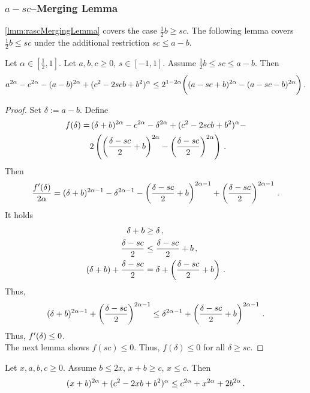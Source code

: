 \subsubsection{$a-sc$--Merging Lemma}
%
\autoref{lmm:rascMergingLemma} covers the case $\frac12 b \geq sc$.
The following lemma covers  $\frac12 b \leq sc$  under the additional restriction $sc \leq a-b$.
%
\begin{lemma}\label{lmm:merging:asc}
	Let $\alpha\in[\frac12,1]$.
	Let $a,b,c\geq0$, $s\in[-1,1]$.
	Assume $\frac12 b \leq sc\leq a-b$.
	Then
	\begin{equation*}
		a^{2\alpha}-c^{2\alpha}-(a-b)^{2\alpha}+(c^2 - 2 s c b + b^2)^\alpha \leq 2^{1-2\alpha} \bigg(
			(a - s c + b)^{2\alpha}  -  (a - s c - b)^{2\alpha}
		\bigg)
		\, .
	\end{equation*}
\end{lemma}
%
\begin{proof}
	Set $\delta:=a-b$.
	Define
	\begin{align*}
		f(\delta) 
		= &\,(\delta+b)^{2\alpha}-c^{2\alpha}-\delta^{2\alpha}+(c^2 - 2 s c b + b^2)^\alpha -
		\\&2 \left( 
					\left( \frac{\delta - s c}{2} + b \right)^{2\alpha}  -  \left( \frac{\delta - s c}{2} \right)^{2\alpha}
				 \right)
		\, .
	\end{align*}
	Then
	\begin{equation*}
		\frac{f^\prime(\delta)}{2\alpha} =
		(\delta+b)^{2\alpha-1}-\delta^{2\alpha-1} 
		- \left( \frac{\delta - s c}{2} + b \right)^{2\alpha-1}
		+ \left( \frac{\delta - s c}{2} \right)^{2\alpha-1}
		\, .
	\end{equation*}
	It holds
	\begin{align*}
		\delta+b &\geq  \delta\, ,\\
		\frac{\delta - s c}{2} &\leq  \frac{\delta - s c}{2} + b\, ,\\
		(\delta+b) + \frac{\delta - s c}{2} &= \delta +\left( \frac{\delta - s c}{2} + b \right)\, .
	\end{align*}
	Thus,
	\begin{equation*}
		(\delta+b)^{2\alpha-1}
		+ \left( \frac{\delta - s c}{2} \right)^{2\alpha-1}
		\leq
		\delta^{2\alpha-1} 
		+\left( \frac{\delta - s c}{2} + b \right)^{2\alpha-1}
		\, .
	\end{equation*}
	Thus, $f^\prime(\delta) \leq 0$.\\ 
	The next lemma shows $f(sc) \leq 0$. Thus, $f(\delta) \leq 0$ for all $\delta \geq sc$.
\end{proof}
%
\begin{lemma}
	Let $x,a,b,c \geq 0$.
	Assume $b \leq 2x$, $x+b \geq c$, $x\leq c$.
	Then
	\begin{equation*}
		(x+b)^{2\alpha}+(c^2 - 2 x b + b^2)^\alpha \leq c^{2\alpha}+x^{2\alpha} + 2 b^{2\alpha} 
		\, .
	\end{equation*}	
\end{lemma}
